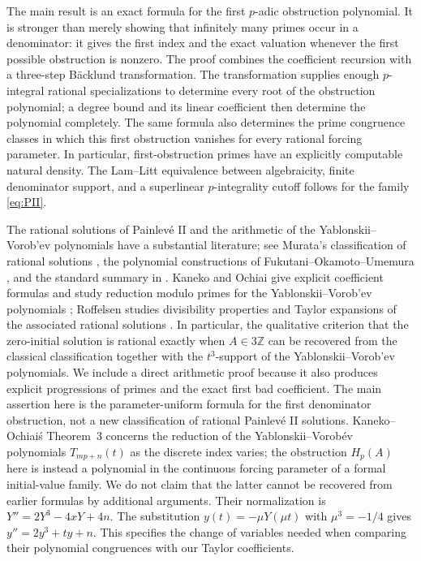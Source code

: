 \documentclass[11pt,a4paper,reqno]{amsart}
\theoremstyle{definition}
\theoremstyle{remark}
\begin{document}
The main result is an exact formula for the first $p$-adic obstruction polynomial. It is stronger than merely showing that infinitely many primes occur in a denominator: it gives the first index and the exact valuation whenever the first possible obstruction is nonzero. The proof combines the coefficient recursion with a three-step B\"acklund transformation. The transformation supplies enough $p$-integral rational specializations to determine every root of the obstruction polynomial; a degree bound and its linear coefficient then determine the polynomial completely. The same formula also determines the prime congruence classes in which this first obstruction vanishes for every rational forcing parameter. In particular, first-obstruction primes have an explicitly computable natural density. The Lam--Litt equivalence between algebraicity, finite denominator support, and a superlinear $p$-integrality cutoff follows for the family \eqref{eq:PII}.

The rational solutions of Painlev\'e II and the arithmetic of the Yablonskii--Vorob'ev polynomials have a substantial literature; see Murata's classification of rational solutions \cite{Murata}, the polynomial constructions of Fukutani--Okamoto--Umemura \cite{Fukutani}, and the standard summary in \cite{DLMF}. Kaneko and Ochiai give explicit coefficient formulas and study reduction modulo primes for the Yablonskii--Vorob'ev polynomials \cite{KanekoOchiai}; Roffelsen studies divisibility properties and Taylor expansions of the associated rational solutions \cite{Roffelsen}. In particular, the qualitative criterion that the zero-initial solution is rational exactly when $A\in3\mathbb Z$ can be recovered from the classical classification together with the $t^3$-support of the Yablonskii--Vorob'ev polynomials. We include a direct arithmetic proof because it also produces explicit progressions of primes and the exact first bad coefficient. The main assertion here is the parameter-uniform formula for the first denominator obstruction, not a new classification of rational Painlev\'e II solutions. Kaneko--Ochiai\'s Theorem~3 concerns the reduction of the Yablonskii--Vorob\'ev polynomials $T_{mp+n}(t)$ as the discrete index varies; the obstruction $H_p(A)$ here is instead a polynomial in the continuous forcing parameter of a formal initial-value family. We do not claim that the latter cannot be recovered from earlier formulas by additional arguments.
Their normalization is $Y''=2Y^3-4xY+4n$.  The substitution
$y(t)=-\mu Y(\mu t)$ with $\mu^3=-1/4$ gives
$y''=2y^3+ty+n$.  This specifies the change of variables needed
when comparing their polynomial congruences with our Taylor coefficients.
\end{document}
